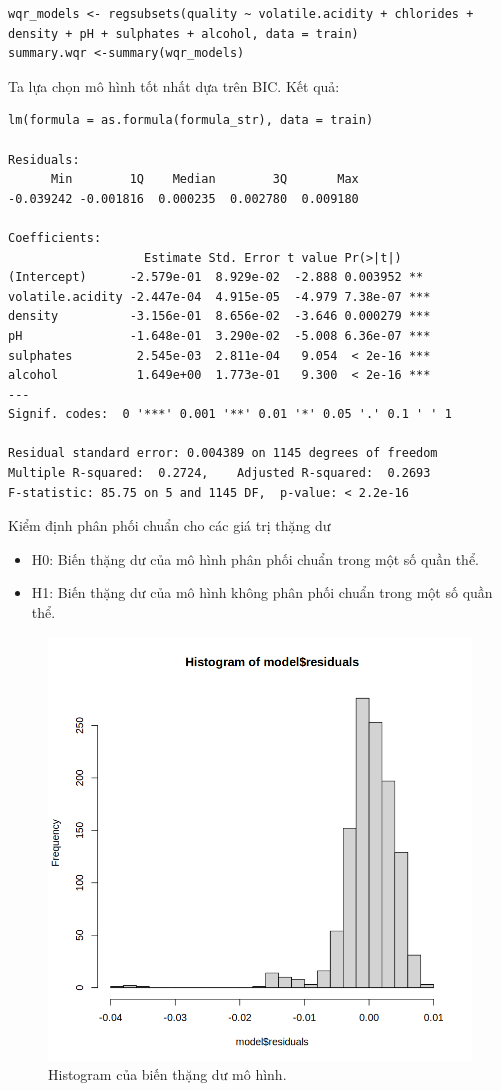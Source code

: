 \begin{lstlisting}
wqr_models <- regsubsets(quality ~ volatile.acidity + chlorides + density + pH + sulphates + alcohol, data = train)
summary.wqr <-summary(wqr_models)
\end{lstlisting}
Ta lựa chọn mô hình tốt nhất dựa trên BIC. Kết quả:
\begin{lstlisting}
lm(formula = as.formula(formula_str), data = train)

Residuals:
      Min        1Q    Median        3Q       Max 
-0.039242 -0.001816  0.000235  0.002780  0.009180 

Coefficients:
                   Estimate Std. Error t value Pr(>|t|)    
(Intercept)      -2.579e-01  8.929e-02  -2.888 0.003952 ** 
volatile.acidity -2.447e-04  4.915e-05  -4.979 7.38e-07 ***
density          -3.156e-01  8.656e-02  -3.646 0.000279 ***
pH               -1.648e-01  3.290e-02  -5.008 6.36e-07 ***
sulphates         2.545e-03  2.811e-04   9.054  < 2e-16 ***
alcohol           1.649e+00  1.773e-01   9.300  < 2e-16 ***
---
Signif. codes:  0 '***' 0.001 '**' 0.01 '*' 0.05 '.' 0.1 ' ' 1

Residual standard error: 0.004389 on 1145 degrees of freedom
Multiple R-squared:  0.2724,	Adjusted R-squared:  0.2693 
F-statistic: 85.75 on 5 and 1145 DF,  p-value: < 2.2e-16
\end{lstlisting}
Kiểm định phân phối chuẩn cho các giá trị thặng dư
\begin{itemize}
    \item H0: Biến thặng dư của mô hình phân phối chuẩn trong một số quần thể.
    \item H1: Biến thặng dư của mô hình không phân phối chuẩn trong một số quần thể.
\end{itemize}
\begin{figure}[H]
    \centering
    \includegraphics[width=0.75\columnwidth]{wine_figures/red_residual_test.png}
    \caption{Histogram của biến thặng dư mô hình.}
    \label{fig:red_residual_test}
\end{figure}
